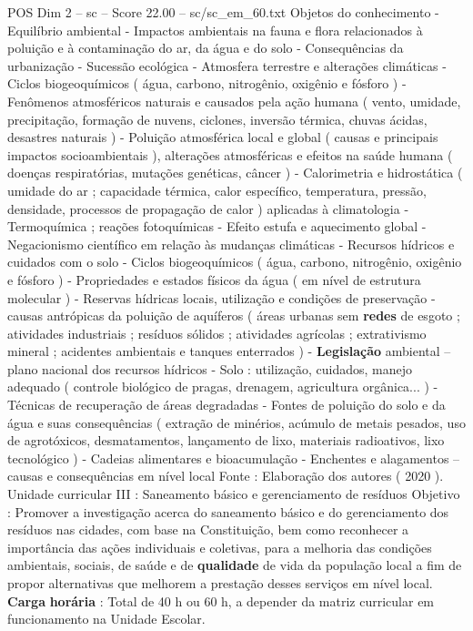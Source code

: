 \begin{textsample}{POS Dim 2 – sc – Score 22.00 – sc/sc\_em\_60.txt}
Objetos do conhecimento - Equilíbrio ambiental - Impactos ambientais na fauna e flora relacionados à poluição e à contaminação do ar, da água e do solo - Consequências da urbanização - Sucessão ecológica - Atmosfera terrestre e alterações climáticas - Ciclos biogeoquímicos ( água, carbono, nitrogênio, oxigênio e fósforo ) - Fenômenos atmosféricos naturais e causados pela ação humana ( vento, umidade, precipitação, formação de nuvens, ciclones, inversão térmica, chuvas ácidas, desastres naturais ) - Poluição atmosférica local e global ( causas e principais impactos socioambientais ), alterações atmosféricas e efeitos na saúde humana ( doenças respiratórias, mutações genéticas, câncer ) - Calorimetria e hidrostática ( umidade do ar ; capacidade térmica, calor específico, temperatura, pressão, densidade, processos de propagação de calor ) aplicadas à climatologia - Termoquímica ; reações fotoquímicas - Efeito estufa e aquecimento global - Negacionismo científico em relação às mudanças climáticas - Recursos hídricos e cuidados com o solo - Ciclos biogeoquímicos ( água, carbono, nitrogênio, oxigênio e fósforo ) - Propriedades e estados físicos da água ( em nível de estrutura molecular ) - Reservas hídricas locais, utilização e condições de preservação - causas antrópicas da poluição de aquíferos ( áreas urbanas sem \textbf{redes} de esgoto ; atividades industriais ; resíduos sólidos ; atividades agrícolas ; extrativismo mineral ; acidentes ambientais e tanques enterrados ) - \textbf{Legislação} ambiental – plano nacional dos recursos hídricos - Solo : utilização, cuidados, manejo adequado ( controle biológico de pragas, drenagem, agricultura orgânica... ) - Técnicas de recuperação de áreas degradadas - Fontes de poluição do solo e da água e suas consequências ( extração de minérios, acúmulo de metais pesados, uso de agrotóxicos, desmatamentos, lançamento de lixo, materiais radioativos, lixo tecnológico ) - Cadeias alimentares e bioacumulação - Enchentes e alagamentos – causas e consequências em nível local Fonte : Elaboração dos autores ( 2020 ).
Unidade curricular III : Saneamento básico e gerenciamento de resíduos Objetivo : Promover a investigação acerca do saneamento básico e do gerenciamento dos resíduos nas cidades, com base na Constituição, bem como reconhecer a importância das ações individuais e coletivas, para a melhoria das condições ambientais, sociais, de saúde e de \textbf{qualidade} de vida da população local a fim de propor alternativas que melhorem a prestação desses serviços em nível local. \textbf{Carga} \textbf{horária} : Total de 40 h ou 60 h, a depender da matriz curricular em funcionamento na Unidade Escolar.

\end{textsample}
